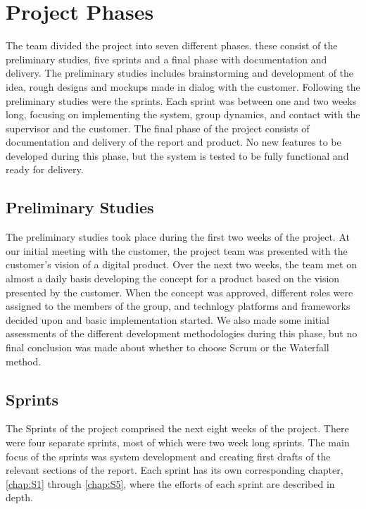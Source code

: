 \section{Project Phases}
\label{sec:PlanningProjPhases}
The team divided the project into seven different phases. these consist of the preliminary studies, five sprints and a final phase with documentation and delivery. The preliminary studies includes brainstorming and development of the idea, rough designs and mockups made in dialog with the customer. Following the preliminary studies were the sprints. Each sprint was between one and two weeks long, focusing on implementing the system, group dynamics, and contact with the supervisor and the customer. The final phase of the project consists of documentation and delivery of the report and product. No new features to be developed during this phase, but the system is tested to be fully functional and ready for delivery.

\subsection{Preliminary Studies}
\label{subsec:PlanningProjPhasesPrelim}
The preliminary studies took place during the first two weeks of the project. At our initial meeting with the customer, the project team was presented with the customer's vision of a digital product. Over the next two weeks, the team met on almost a daily basis developing the concept for a product based on the vision presented by the customer. When the concept was approved, different roles were assigned to the members of the group, and technlogy platforms and frameworks decided upon and basic implementation started. We also made some initial assessments of the different development methodologies during this phase, but no final conclusion was made about whether to choose Scrum or the Waterfall method.

\subsection{Sprints}
\label{subsec:PlanningProjPhasesSprints}
The Sprints of the project comprised the next eight weeks of the project. There were four separate sprints, most of which were two week long sprints. The main focus of the sprints was system development and creating first drafts of the relevant sections of the report. Each sprint has its own corresponding chapter, \ref{chap:S1} through \ref{chap:S5}, where the efforts of each sprint are described in depth.

